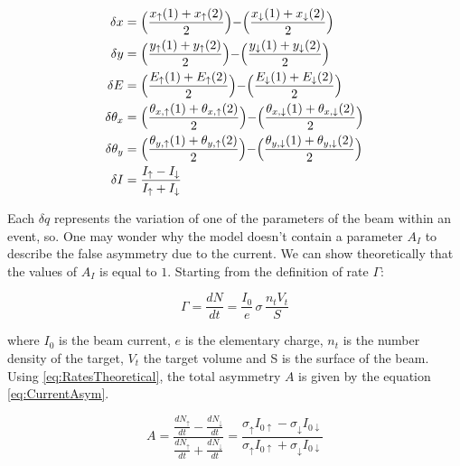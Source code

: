 \begin{equation} \label{eq:BeamParameter}
\begin{split}
\delta {x} & = \Bigl(\dfrac{x_{\uparrow}(1) + x_{\uparrow}(2)}{2}\Bigl)  - \Bigl(\dfrac{x_{\downarrow}(1) + x_{\downarrow}(2)}{2}\Bigl)\\
\delta {y} & = \Bigl(\dfrac{y_{\uparrow}(1) + y_{\uparrow}(2)}{2}\Bigl)  - \Bigl(\dfrac{y_{\downarrow}(1) + y_{\downarrow}(2)}{2}\Bigl)\\
\delta {E} & = \Bigl(\dfrac{E_{\uparrow}(1) + E_{\uparrow}(2)}{2}\Bigl)  - \Bigl(\dfrac{E_{\downarrow}(1) + E_{\downarrow}(2)}{2}\Bigl)\\
\delta {\theta_{x}} & = \Bigl( \dfrac{\theta_{x,\uparrow}(1) + \theta_{x,\uparrow}(2)}{2} \Bigl) - \Bigl(\dfrac{\theta_{x,\downarrow}(1) + \theta_{x,\downarrow}(2)}{2} \Bigl)\\
\delta {\theta_{y}} & = \Bigl( \dfrac{\theta_{y,\uparrow}(1) + \theta_{y,\uparrow}(2)}{2} \Bigl) - \Bigl(\dfrac{\theta_{y,\downarrow}(1) + \theta_{y,\downarrow}(2)}{2} \Bigl)\\ 
\delta I &= \dfrac{I_{\uparrow} - I_{\downarrow}}{I_{\uparrow} + I_{\downarrow}} \\
\end{split}
\end{equation}

Each $\delta q$ represents the variation of one of the parameters of the beam within an event, so.
One may wonder why the model doesn't contain a parameter $A_{I}$ to describe the false asymmetry due to the current. We can show theoretically that the values of $A_{I}$ is equal to $1$. Starting from the definition of rate $\Gamma$:

\begin{equation} \label{eq:RatesTheoretical}
\Gamma = \frac{dN}{dt} = \frac{I_{0}}{e} \, \sigma \, \frac{n_{t} V_t}{S}
\end{equation}

where $I_{0}$ is the beam current, $e$ is the elementary charge, $n_{t}$ is the number density of the target, $V_{t}$ the target volume and S is the surface of the beam. Using \ref{eq:RatesTheoretical}, the total asymmetry $A$ is given by the equation \ref{eq:CurrentAsym}.

\begin{equation} \label{eq:CurrentAsym}
A = \dfrac{\frac{dN_{\uparrow}}{dt} - \frac{dN_{\downarrow}}{dt}}{\frac{dN_{\uparrow}}{dt} + \frac{dN_{\downarrow}}{dt}} = \dfrac{\sigma_{\uparrow} I_{0 \uparrow} - \sigma_{\downarrow} I_{0 \downarrow}}{\sigma_{\uparrow} I_{0 \uparrow} + \sigma_{\downarrow} I_{0 \downarrow}}
\end{equation}

